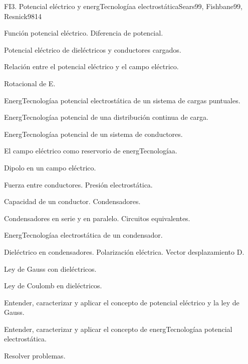 \begin{syllabus}
\begin{unit}{FI3. Potencial eléctrico y energTecnologíaa electrostática}{Sears99, Fishbane99, Resnick98}{14}
   \begin{topics}
         \item  Función potencial eléctrico. Diferencia de potencial.
	 \item  Potencial eléctrico de dieléctricos y conductores cargados.
         \item  Relación entre el potencial eléctrico y el campo eléctrico.
	 \item  Rotacional de E.
         \item  EnergTecnologíaa potencial electrostática de un sistema de cargas puntuales.
	 \item  EnergTecnologíaa potencial de una distribución continua de carga.
         \item  EnergTecnologíaa potencial de un sistema de conductores.
	 \item  El campo eléctrico como reservorio de energTecnologíaa.
         \item  Dipolo en un campo eléctrico.
         \item  Fuerza entre conductores.  Presión electrostática.
         \item  Capacidad de un conductor. Condensadores.
         \item  Condensadores en serie y en paralelo.  Circuitos equivalentes.
         \item  EnergTecnologíaa electrostática de un condensador.
         \item  Dieléctrico en condensadores.  Polarización eléctrica.  Vector desplazamiento D.
         \item  Ley de Gauss con dieléctricos.
         \item  Ley de Coulomb en dieléctricos.
   \end{topics}

   \begin{unitgoals}
         \item  Entender, caracterizar y aplicar el concepto de potencial eléctrico y la ley de Gauss.
         \item  Entender, caracterizar y aplicar el concepto de energTecnologíaa potencial electrostática.
         \item  Resolver problemas.
   \end{unitgoals}
\end{unit}


\end{syllabus}
